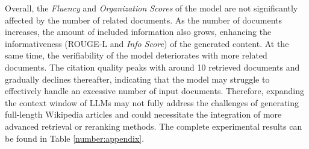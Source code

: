 \documentclass[11pt]{article}
\begin{document}
Overall, the \textit{Fluency} and \textit{Organization Scores} of the model are not significantly affected by the number of related documents. As the number of documents increases, the amount of included information also grows, enhancing the informativeness (ROUGE-L and \textit{Info Score}) of the generated content. At the same time, the verifiability of the model deteriorates with more related documents. The citation quality peaks with around 10 retrieved documents and gradually declines thereafter, indicating that the model may struggle to effectively handle an excessive number of input documents. Therefore, expanding the context window of LLMs may not fully address the challenges of generating full-length Wikipedia articles and could necessitate the integration of more advanced retrieval or reranking methods. The complete experimental results can be found in Table \ref{number:appendix}.

\begin{table}[t]
\caption{Performance of different rerankers with the top 5 documents are used for generation.}
\label{tab:retrievers}
\end{table}
\end{document}
